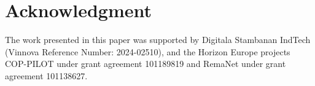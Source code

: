 \section*{Acknowledgment}
The work presented in this paper was supported by Digitala Stambanan IndTech (Vinnova
Reference Number: 2024-02510), and the Horizon Europe projects COP-PILOT under grant
agreement 101189819 and RemaNet under grant agreement 101138627.
